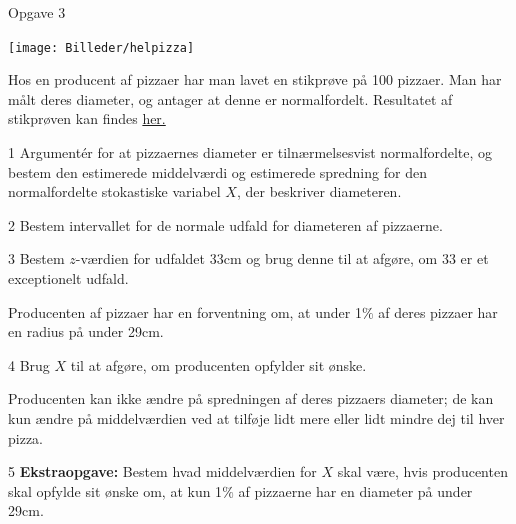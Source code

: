 \documentclass[12pt,x11names,a4paper]{article}
\begin{document}
\begin{opgavetekst}{Opgave 3}
	\begin{center}
		\texttt{[image: Billeder/helpizza]}
	\end{center}
	Hos en producent af pizzaer har man lavet en stikprøve på 100 pizzaer. Man har målt deres
	diameter, og antager at denne er normalfordelt. Resultatet af stikprøven kan findes 
	\href{https://github.com/ChristianJLex/TeachingNotes/raw/master/2023-2024/Data og lign/Pizzaradius.xlsx}{\color{blue!60} her.}
\end{opgavetekst}
\begin{delopgave}{}{1}
	Argumentér for at pizzaernes diameter er tilnærmelsesvist normalfordelte, og bestem den 
	estimerede middelværdi og estimerede spredning for den normalfordelte stokastiske variabel
	$X$, der beskriver diameteren.
\end{delopgave}
\begin{delopgave}{}{2}
	Bestem intervallet for de normale udfald for diameteren af pizzaerne.
\end{delopgave}
\begin{delopgave}{}{3}
	Bestem $z$-værdien for udfaldet 33cm og brug denne til at afgøre, om 33 er et exceptionelt
	udfald.
\end{delopgave}
\begin{meretekst}
	Producenten af pizzaer har en forventning om, at under 1$\%$ af deres pizzaer har en radius 	på under 29cm.
\end{meretekst}
\begin{delopgave}{}{4}
	Brug $X$ til at afgøre, om producenten opfylder sit ønske.
\end{delopgave}
\begin{meretekst}
	Producenten kan ikke ændre på spredningen af deres pizzaers diameter; de kan kun ændre på 
	middelværdien ved at tilføje lidt mere eller lidt mindre dej til hver pizza.
\end{meretekst}
\begin{delopgave}{}{5}
	\textbf{Ekstraopgave:} Bestem hvad middelværdien for $X$ skal være, hvis producenten skal
	opfylde sit ønske om, at kun 1$\%$ af pizzaerne har en diameter på under 29cm.
\end{delopgave}
\end{document}
